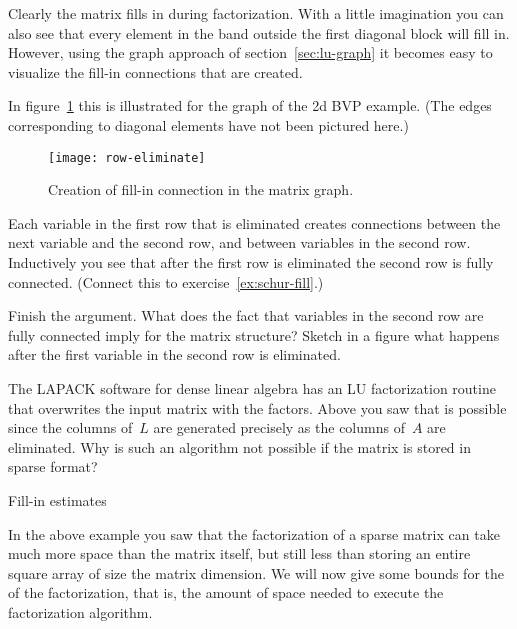 Clearly the matrix fills in during factorization. With a
little imagination you can also see that every element in the band
outside the first diagonal block will fill in. However, using the
graph approach of section~\ref{sec:lu-graph} it becomes easy to
visualize the fill-in connections that are created.

In figure~\ref{fig:row-eliminate} this is illustrated for the 
graph of the 2d \ac{BVP} example. (The edges corresponding to diagonal
elements have not been pictured here.)
\begin{figure}
  \texttt{[image: row-eliminate]}
  \caption{Creation of fill-in connection in the matrix graph.}
  \label{fig:row-eliminate}
\end{figure}
Each variable in the first row that is eliminated creates connections
between the next variable and the second row, and between variables in
the second row. Inductively you see that after the first row is
eliminated the second row is fully connected. (Connect this to
exercise~\ref{ex:schur-fill}.)

\begin{exercise}
  Finish the argument. What does the fact that variables in the second
  row are fully connected imply for the matrix structure? Sketch in a
  figure what happens after the first variable in the second row is
  eliminated.
\end{exercise}

\begin{exercise}
  The LAPACK software for dense linear algebra has an LU factorization
  routine that overwrites the input matrix with the factors. Above you
  saw that is possible since the columns of~$L$ are generated
  precisely as the columns of~$A$ are eliminated. Why is such an
  algorithm not possible if the matrix is stored in sparse format?
\end{exercise}

 {Fill-in estimates}
\label{sec:bandfill}

In the above example you saw that the factorization of a sparse matrix
can take much more space than the matrix itself, but still less than
storing an entire square array of size the matrix dimension. We will now give
some bounds for the  of the
factorization, that is, the amount of space needed to execute the
factorization algorithm.

